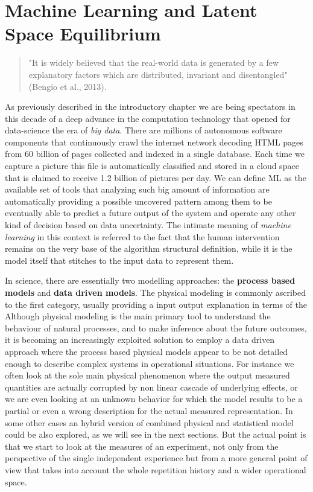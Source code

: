 \chapter{Machine Learning and Latent Space Equilibrium}
%
\begin{quote}
"It is widely believed that the real-world data is generated by a few explanatory factors which are distributed, invariant and disentangled" (Bengio et al., 2013).
\end{quote}
%
As previously described in the introductory chapter we are being spectators in this decade of a deep advance in the computation technology that opened for data-science the era of \textit{big data}. There are millions of autonomous software components that continuously crawl the internet network decoding HTML pages from 60 billion of pages collected and indexed in a single database. Each time we capture a picture this file is automatically classified and stored in a cloud space that is claimed to receive 1.2 billion of pictures per day. 
%
We can define ML as the available set of tools that analyzing such big amount of information are automatically providing a possible uncovered pattern among them to be eventually able to predict a future output of the system and operate any other kind of decision based on data uncertainty. The intimate meaning of \textit{machine learning} in this context is referred to the fact that the human intervention remains on the very base of the algorithm structural definition, while it is the model itself that stitches to the input data to represent them.

In science, there are essentially two modelling approaches: the \textbf{process based models} and \textbf{data driven models}.
The physical modeling is commonly ascribed to the first category, usually providing a input output explanation in terms of the
Although physical modeling is the main primary tool to understand the behaviour of natural processes, and to make inference about the future outcomes, it is becoming an increasingly exploited solution to employ a data driven approach where the process based physical models appear to be not detailed enough to describe complex systems in operational situations. For instance we often look at the sole main physical phenomenon where the output measured quantities are actually corrupted by non linear cascade of underlying effects, or we are even looking at an unknown behavior for which the model results to be a partial or even a wrong description for the actual measured representation. 
In some other cases an hybrid version of combined physical and statistical model could be also explored, as we will see in the next sections. But the actual point is that we start to look at the measures of an experiment, not only from the perspective of the single independent experience but from a more general point of view that takes into account the whole repetition history and a wider operational space.  


